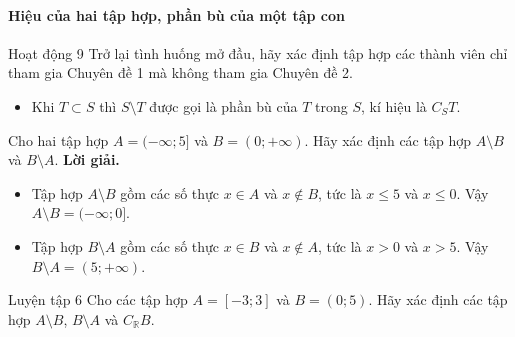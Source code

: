 \begin{kienthuc}
	\paragraph{Hiệu của hai tập hợp, phần bù của một tập con}
	\begin{hoatdong}{Hoạt động 9}
		Trở lại tình huống mở đầu, hãy xác định tập hợp các thành viên chỉ tham gia Chuyên đề 1 mà không tham gia Chuyên đề 2.
	\end{hoatdong}
	\begin{itemize}
		\item Khi $T \subset S$ thì $S \setminus T$ được gọi là phần bù của $T$ trong $S$, kí hiệu là $C_S T$.
	\end{itemize}
	\begin{vd}
		Cho hai tập hợp $A = (-\infty; 5]$ và $B = (0; +\infty)$. Hãy xác định các tập hợp $A \setminus B$ và $B \setminus A$.
		\textbf{Lời giải.}
		\begin{itemize}
			\item Tập hợp $A \setminus B$ gồm các số thực $x \in A$ và $x \notin B$, tức là $x \le 5$ và $x \le 0$. Vậy $A \setminus B = (-\infty; 0]$.
			\item Tập hợp $B \setminus A$ gồm các số thực $x \in B$ và $x \notin A$, tức là $x > 0$ và $x > 5$. Vậy $B \setminus A = (5; +\infty)$.
		\end{itemize}
	\end{vd}
	\begin{hoatdong}{Luyện tập 6}
		Cho các tập hợp $A = [-3; 3]$ và $B = (0; 5)$. Hãy xác định các tập hợp $A \setminus B$, $B \setminus A$ và $C_{\mathbb{R}} B$.
	\end{hoatdong}
\end{kienthuc}


